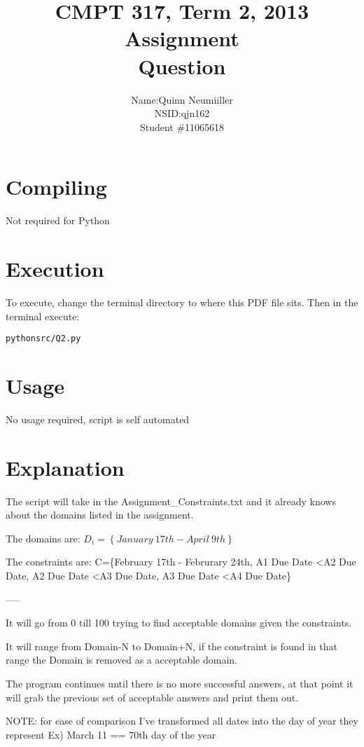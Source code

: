 \documentclass{article}
\title{CMPT 317, Term 2, 2013\\
Assignment \AssignmentNum\\
Question \QuestionNum\\
\AssignmentTitle
}
\author{
	\begin{tabular}{ l r }
	  Name: & Quinn Neumiiller \\
	  NSID: & qjn162 \\
	  Student \# & 11065618 \\
	\end{tabular}
}
\date{\AssignmentDate}
\newcommand{\QuestionNum}{2}
\begin{document}
   \maketitle
   
   \section{Compiling}
   Not required for Python

   \section{Execution}
   To execute, change the terminal directory to where this PDF file sits.
   Then in the terminal execute:
	\begin{alltt}
	python src/Q\QuestionNum.py
	\end{alltt}

  \section{Usage}
    No usage required, script is self automated
  \section{Explanation}
    The script will take in the Assignment\_Constraints.txt and it already knows about the domains listed in the assignment.

    The domains are:
    $D_i=\left\{{January\ 17th - April\ 9th}\right\}$

    The constraints are:
    C=\{February 17th - Februrary 24th, A1 Due Date \textless A2 Due Date, A2 Due Date \textless A3 Due Date, A3 Due Date \textless A4 Due Date\}

    -----




    It will go from 0 till 100 trying to find acceptable domains given the constraints.

    It will range from Domain-N to Domain+N, if the constraint is found in that range the
    Domain is removed as a acceptable domain.

    The program continues until there is no more successful answers, at that point it will grab the previous
    set of acceptable answers and print them out.

    NOTE: for ease of comparison I've transformed all dates into the day of year they represent
    Ex) March 11 == 70th day of the year
\end{document}
